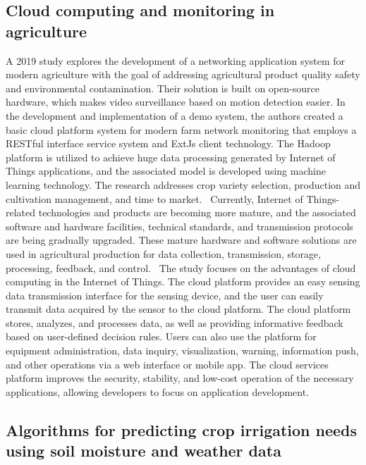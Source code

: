\documentclass[11pt]{scrartcl} %
\begin{document}
\subsection{Cloud computing and monitoring in agriculture}
A 2019 study explores the development of a networking application system for modern agriculture with the goal of addressing agricultural product quality safety and environmental contamination. Their solution is built on open-source hardware, which makes video surveillance based on motion detection easier. In the development and implementation of a demo system, the authors created a basic cloud platform system for modern farm network monitoring that employs a RESTful interface service system and \gls{ExtJs} client technology. The \gls{Hadoop} platform is utilized to achieve huge data processing generated by Internet of Things applications, and the associated model is developed using machine learning technology. The research addresses crop variety selection, production and cultivation management, and time to market.~\parencite{cloud_computing_and_monitoring}
\newline Currently, Internet of Things-related technologies and products are becoming more mature, and the associated software and hardware facilities, technical standards, and transmission protocols are being gradually upgraded. These mature hardware and software solutions are used in agricultural production for data collection, transmission, storage, processing, feedback, and control.~\parencite{cloud_computing_and_monitoring}
\newline The study focuses on the advantages of cloud computing in the Internet of Things. The cloud platform provides an easy sensing data transmission interface for the sensing device, and the user can easily transmit data acquired by the sensor to the cloud platform. The cloud platform stores, analyzes, and processes data, as well as providing informative feedback based on user-defined decision rules. Users can also use the platform for equipment administration, data inquiry, visualization, warning, information push, and other operations via a web interface or mobile app. The cloud services platform improves the security, stability, and low-cost operation of the necessary applications, allowing developers to focus on application development.~\parencite{cloud_computing_and_monitoring}
\subsection{Algorithms for predicting crop irrigation needs using soil moisture and weather data}
\end{document}
